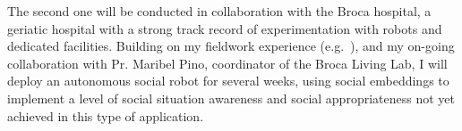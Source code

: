 The second one will be conducted in collaboration with the Broca hospital, a
geriatic hospital with a strong track record of experimentation with robots and
dedicated facilities.  Building on my fieldwork experience
(e.g.~\cite{hood2015when,mondada2015ranger,winkle2018social,cooper2023challenges}),
and my on-going collaboration with Pr. Maribel Pino, coordinator of the Broca
Living Lab, I will deploy an autonomous social robot for several weeks, using
social embeddings to implement a level of social situation awareness and social
appropriateness not yet achieved in this type of application.


%
%
%

%
%

%
%
%
%



